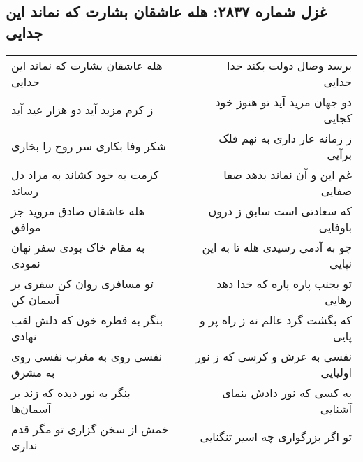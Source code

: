 \begin{center}
\section*{غزل شماره ۲۸۳۷: هله عاشقان بشارت که نماند این جدایی}
\label{sec:2837}
\begin{longtable}{l p{0.5cm} r}
هله عاشقان بشارت که نماند این جدایی
&&
برسد وصال دولت بکند خدا خدایی
\\
ز کرم مزید آید دو هزار عید آید
&&
دو جهان مرید آید تو هنوز خود کجایی
\\
شکر وفا بکاری سر روح را بخاری
&&
ز زمانه عار داری به نهم فلک برآیی
\\
کرمت به خود کشاند به مراد دل رساند
&&
غم این و آن نماند بدهد صفا صفایی
\\
هله عاشقان صادق مروید جز موافق
&&
که سعادتی است سابق ز درون باوفایی
\\
به مقام خاک بودی سفر نهان نمودی
&&
چو به آدمی رسیدی هله تا به این نپایی
\\
تو مسافری روان کن سفری بر آسمان کن
&&
تو بجنب پاره پاره که خدا دهد رهایی
\\
بنگر به قطره خون که دلش لقب نهادی
&&
که بگشت گرد عالم نه ز راه پر و پایی
\\
نفسی روی به مغرب نفسی روی به مشرق
&&
نفسی به عرش و کرسی که ز نور اولیایی
\\
بنگر به نور دیده که زند بر آسمان‌ها
&&
به کسی که نور دادش بنمای آشنایی
\\
خمش از سخن گزاری تو مگر قدم نداری
&&
تو اگر بزرگواری چه اسیر تنگنایی
\\
\end{longtable}
\end{center}
